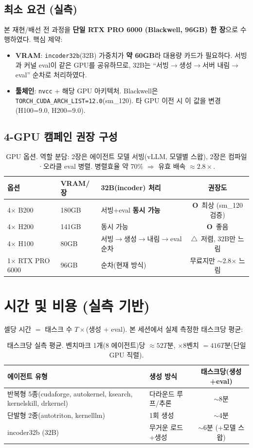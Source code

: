 \documentclass[11pt]{article}
\newcommand{\yes}{\textcolor{green!55!black}{\textbf{O}}}
\newcommand{\warn}{\textcolor{orange!85!black}{\textbf{$\triangle$}}}
\newcommand{\code}[1]{\texttt{\small #1}}
\begin{document}
\subsection{최소 요건 (실측)}
본 재현/배선 전 과정을 \textbf{단일 RTX PRO 6000 (Blackwell, 96GB) 한 장}으로 수행하였다. 핵심 제약:
\begin{itemize}
  \item \textbf{VRAM}: \code{incoder32b}(32B) 가중치가 \textbf{약 60GB}라 대용량 카드가 필요하다.
        서빙과 커널 eval이 같은 GPU를 공유하므로, 32B는 ``서빙$\to$생성$\to$서버 내림$\to$eval'' 순차로 처리하였다.
  \item \textbf{툴체인}: \code{nvcc} + 해당 GPU 아키텍처. Blackwell은 \code{TORCH\_CUDA\_ARCH\_LIST=12.0}(sm\_120).
        타 GPU 이전 시 이 값을 변경(H100=9.0, H200=9.0).
\end{itemize}

\subsection{4-GPU 캠페인 권장 구성}
\begin{table}[h]
\centering
\begin{tabular}{@{}lllc@{}}
\toprule
\textbf{옵션} & \textbf{VRAM/장} & \textbf{32B(incoder) 처리} & \textbf{권장도} \\
\midrule
4$\times$ B200 & 180GB & 서빙+eval \textbf{동시 가능} & \yes\ 최상 (sm\_120 검증) \\
4$\times$ H200 & 141GB & 동시 가능 & \yes\ 좋음 \\
4$\times$ H100 & 80GB  & 서빙$\to$생성$\to$내림$\to$eval 순차 & \warn\ 저렴, 32B만 느림 \\
1$\times$ RTX PRO 6000 & 96GB & 순차(현재 방식) & 무료지만 $\sim$2.8$\times$ 느림 \\
\bottomrule
\end{tabular}
\caption{GPU 옵션. 역할 분담: 2장은 에이전트 모델 서빙(vLLM, 모델별 스왑), 2장은 컴파일·오라클 eval 병렬.
병렬효율 약 70\% $\Rightarrow$ 유효 배속 $\approx 2.8\times$.}
\end{table}

\section{시간 및 비용 (실측 기반)}
셀당 시간 $=$ 태스크 수 $T \times$(생성 $+$ eval). 본 세션에서 실제 측정한 태스크당 평균:

\begin{table}[h]
\centering
\begin{tabular}{@{}llc@{}}
\toprule
\textbf{에이전트 유형} & \textbf{생성 방식} & \textbf{태스크당(생성+eval)} \\
\midrule
반복형 5종(cudaforge, autokernel, ksearch, kernelskill, drkernel) & 다라운드 루프/추론 & $\sim$8분 \\
단발형 2종(autotriton, kernelllm) & 1회 생성 & $\sim$4분 \\
incoder32b (32B) & 무거운 로드+생성 & $\sim$6분 (+모델 스왑) \\
\bottomrule
\end{tabular}
\caption{태스크당 실측 평균. 벤치마크 1개(8 에이전트)당 $\approx 52T$분, $\times 8$벤치 $= 416T$분(단일 GPU 직렬).}
\end{table}
\end{document}

